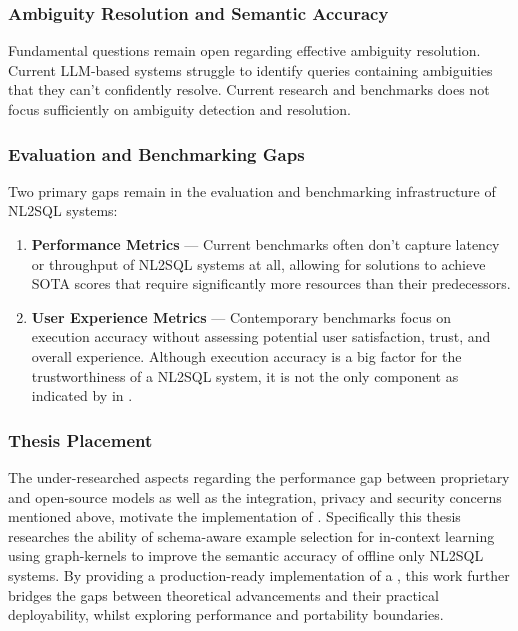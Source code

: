 \subsubsection{Ambiguity Resolution and Semantic Accuracy}

Fundamental questions remain open regarding effective ambiguity
resolution. Current LLM-based systems struggle to identify queries containing
ambiguities that they can't confidently resolve. Current research and
benchmarks does not focus sufficiently on ambiguity detection and resolution.

\subsubsection{Evaluation and Benchmarking Gaps}

Two primary gaps remain in the evaluation and benchmarking infrastructure of
NL2SQL systems:

\begin{enumerate}
    \item \textbf{Performance Metrics} — Current benchmarks often don't capture
        latency or throughput of NL2SQL systems at all, allowing for solutions
        to achieve SOTA scores that require significantly more
        resources than their predecessors.
    \item \textbf{User Experience Metrics} — Contemporary benchmarks focus on
        execution accuracy without assessing potential user satisfaction,
        trust, and overall experience. Although execution accuracy is a big
        factor for the trustworthiness of a NL2SQL system, it is not the only
        component as indicated by \citeauthor*{NALIR} in \citeyear{NALIR}.
\end{enumerate}

\subsubsection{Thesis Placement}

The under-researched aspects regarding the performance gap between proprietary
and open-source models as well as the integration, privacy and security
concerns mentioned above, motivate the implementation of \Natural. Specifically
this thesis researches the ability of schema-aware example selection for
in-context learning using graph-kernels to improve the semantic accuracy of
offline only NL2SQL systems. By providing a production-ready implementation of
a \Natural, this work further bridges the gaps between theoretical advancements
and their practical deployability, whilst exploring performance and portability
boundaries.
